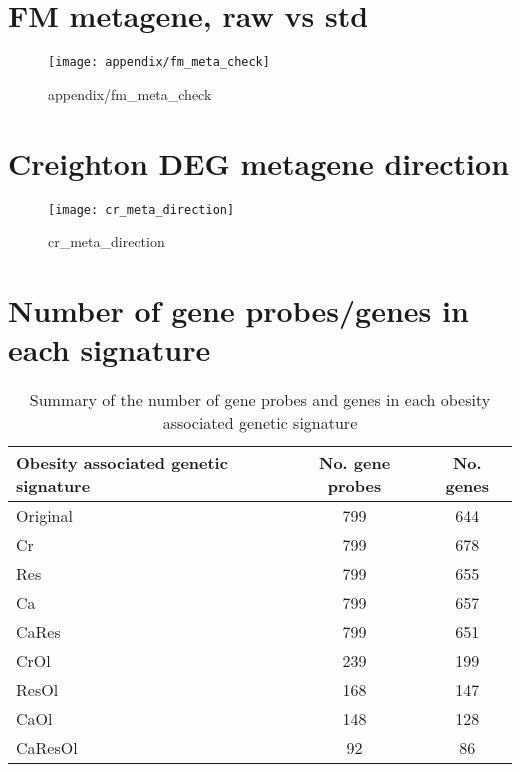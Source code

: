 \begin{appendices}
	\section{FM metagene, raw vs std}
	\label{sec:fm_metagene_raw_vs_std}
	
	\begin{figure}[htpb]
		\centering
		\texttt{[image: appendix/fm\_meta\_check]}
		\caption{appendix/fm_meta_check}
		\label{fig:appendix/fm_meta_check}
	\end{figure}
	

	\section{Creighton DEG metagene direction}
	\label{sec:creighton_deg_metagene_direction}
	
	\begin{figure}[htpb]
		\centering
		\texttt{[image: cr\_meta\_direction]}
		\caption{cr_meta_direction}
		\label{fig:cr_meta_direction}
	\end{figure}
	
	
	\section{Number of gene probes/genes in each signature}
	\label{app:number_of_gene_probes_genes_in_each_signature}
	
	\begin{table}[htbp]
		\centering
		\caption{Summary of the number of gene probes and genes in each obesity associated genetic signature}
		\label{tab:signature_gene_num}
		\begin{tabular}{lcc}
			Obesity associated genetic signature & No. gene probes   & No. genes\\
			\hline
			\rule{0pt}{2.25ex}Original & 799 & 644\\
			Cr                         & 799 & 678\\
			Res                        & 799 & 655\\
			Ca                         & 799 & 657\\
			CaRes                      & 799 & 651\\
			CrOl                       & 239 & 199\\
			ResOl                      & 168 & 147\\
			CaOl                       & 148 & 128\\
			CaResOl                    & 92  & 86\\
			\hline
			\hline
		\end{tabular}
	\end{table}


\end{appendices}
